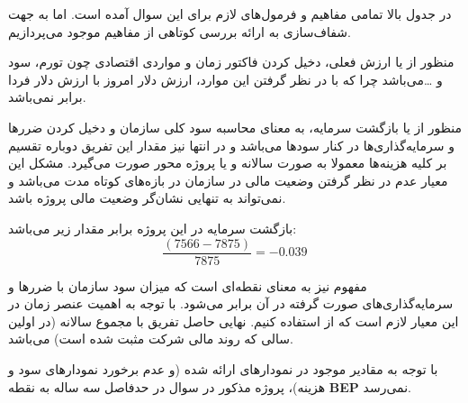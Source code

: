 در جدول بالا تمامی مفاهیم و فرمول‌های لازم برای این سوال آمده است. اما به جهت شفاف‌سازی به ارائه بررسی کوتاهی از مفاهیم موجود می‌پردازیم.

منظور از 
\textbf{}
یا ارزش فعلی، دخیل کردن فاکتور زمان و مواردی اقتصادی چون تورم، سود و \ldots می‌باشد چرا که با در نظر گرفتن این موارد، ارزش دلار امروز با ارزش دلار فردا برابر نمی‌باشد.

منظور از 
\textbf{}
یا بازگشت سرمایه، به معنای محاسبه سود کلی سازمان و دخیل کردن ضررها و سرمایه‌گذاری‌ها در کنار سودها می‌باشد و در انتها نیز مقدار این تفریق دوباره تقسیم بر کلیه هزینه‌ها معمولا به صورت سالانه و یا پروژه محور صورت می‌گیرد. مشکل این معیار عدم در نظر گرفتن وضعیت مالی در سازمان در بازه‌های کوتاه مدت می‌باشد و نمی‌تواند به تنهایی نشان‌گر وضعیت مالی پروژه باشد.

بازگشت سرمایه در این پروژه برابر مقدار زیر می‌باشد:
\[
\frac{(7566 - 7875)}{7875} = -0.039
\]

مفهوم 
\textbf{}
نیز به معنای نقطه‌ای است که میزان سود سازمان با ضررها و سرمایه‌گذاری‌های صورت گرفته در آن برابر می‌شود. با توجه به اهمیت عنصر زمان در این معیار لازم است که از 
\textbf{} استفاده کنیم. نهایی حاصل تفریق 
\textbf{} با مجموع \textbf{} سالانه (در اولین سالی که روند مالی شرکت مثبت شده است) می‌باشد.

با توجه به مقادیر موجود در نمودارهای ارائه شده (و عدم برخورد نمودار‌های سود و هزینه)، پروژه مذکور در سوال در حدفاصل سه ساله به نقطه \textbf{BEP} نمی‌رسد.